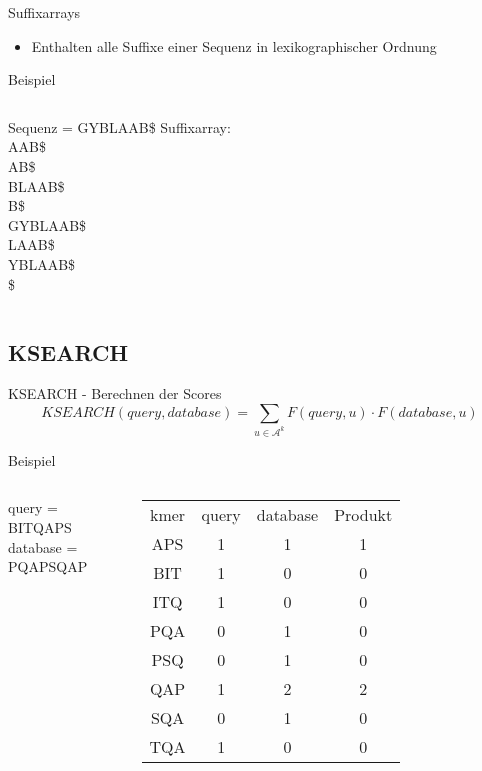\documentclass[aspectratio=1610]{beamer}
\begin{document}
\begin{frame}{Suffixarrays}
  \begin{itemize}
    \item Enthalten alle Suffixe einer Sequenz in lexikographischer Ordnung
  \end{itemize}
  \begin{block}{Beispiel}
    \begin{columns}
        Sequenz = GYBLAAB\$
      \scriptsize{}
        Suffixarray:\\
        AAB\$\\
        AB\$\\
        BLAAB\$\\
        B\$\\
        GYBLAAB\$\\
        LAAB\$\\
        YBLAAB\$\\
        \$\\
      \normalsize
    \end{columns}
  \end{block}
\end{frame}

\subsection{KSEARCH}

\begin{frame}{KSEARCH - Berechnen der Scores}
  \begin{equation*}
    KSEARCH(query,database) = \sum_{u \in \mathcal A^k} F(query,u) \cdot F(database,u)
  \end{equation*}  
  \begin{block}{Beispiel}
    \begin{columns}
    query = BITQAPS\\
    database = PQAPSQAP\\  
    \scriptsize\begin{tabular}{cccc}
    kmer & query & database & Produkt\\
    APS & 1 & 1 & 1\\
    BIT & 1 & 0 & 0\\
    ITQ & 1 & 0 & 0 \\
    PQA & 0 & 1 & 0\\
    PSQ & 0 & 1 & 0\\
    QAP & 1 & 2 & 2\\
    SQA & 0 & 1 & 0\\
    TQA & 1 & 0 & 0\\    
    \end{tabular}
    \normalsize
    \end{columns}
  \end{block}
\end{frame}
\end{document}

